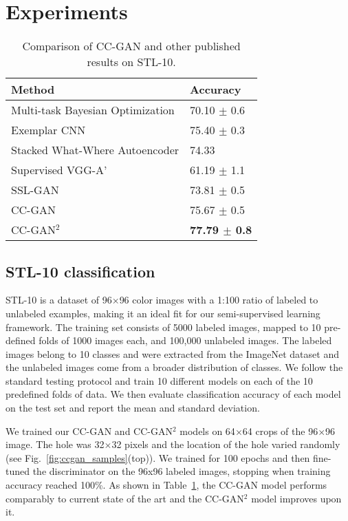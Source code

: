 \documentclass{article} %
\newcommand{\fig}[1]{Fig.~\ref{fig:#1}}
\newcommand{\tab}[1]{Table~\ref{tab:#1}}
\begin{document}
\vspace{1em}\section{Experiments}\begin{table}[!t]
\centering
\small
\begin{tabularx}{0.7\textwidth}{l|l}
\bf{Method} & \bf{Accuracy}\\
\hline
\hline
Multi-task Bayesian Optimization \citep{swersky2013} & 70.10 $\pm$ 0.6 \\
Exemplar CNN \citep{dosovitskiy2014b} & 75.40 $\pm$ 0.3 \\
Stacked What-Where Autoencoder \citep{zhao2016}& 74.33 \\
\hline
Supervised VGG-A'  & 61.19 $\pm$ 1.1\\
SSL-GAN  & 73.81 $\pm$ 0.5\\
CC-GAN& 75.67 $\pm$ 0.5 \\
CC-GAN$^2$& \bf{77.79} $\pm$ 0.8 \\
\end{tabularx}
\vspace{2mm}
\caption{Comparison of CC-GAN and other published results on STL-10.}
\label{tab:stl}
\end{table}\subsection{STL-10 classification}STL-10 is a dataset of 96$\times$96 color images with a 1:100 ratio of labeled to unlabeled examples, making it an ideal fit for our semi-supervised learning framework. 
The training set consists of 5000 labeled images, mapped to 10 pre-defined folds of 1000 images each, and 100,000 unlabeled images.
The labeled images belong to 10 classes and were extracted from the ImageNet dataset and the unlabeled images come from a broader distribution of classes. 
We follow the standard testing protocol and train 10 different models on each of the 10 predefined folds of data. 
We then evaluate classification accuracy of each model on the test set and report the mean and standard deviation. 

We trained our CC-GAN and CC-GAN$^2$ models on 64$\times$64 crops of the 96$\times$96
image. The hole was 32$\times$32 pixels and the location of the hole
varied randomly (see \fig{ccgan_samples}(top)).  
We trained for 100 epochs and then 
fine-tuned the discriminator on the 96x96
labeled images, stopping when training accuracy reached 100\%. 
As shown in \tab{stl}, the CC-GAN model performs comparably to current state of the art \citep{dosovitskiy2014b} and the CC-GAN$^2$ model improves upon it.
\end{document}
